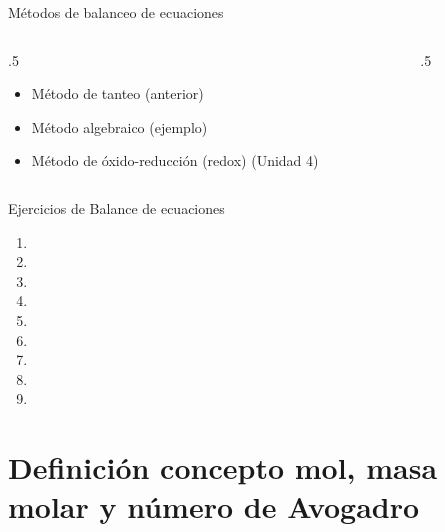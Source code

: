 \documentclass[11pt, aspectratio=169, xcolor=table]{beamer}
\begin{document}
\begin{frame}{Métodos de balanceo de ecuaciones}
	\begin{columns}
		\begin{column}{.5\textwidth}
			\begin{itemize}[<+->]
				\item Método de tanteo (anterior)
				\item Método algebraico (ejemplo)
				\item Método de óxido-reducción (redox) (Unidad 4)
			\end{itemize}
		\end{column}
		\begin{column}{.5\textwidth}
		\end{column}
	\end{columns}
\end{frame}

\begin{frame}{Ejercicios de Balance de ecuaciones}
	\begin{enumerate}
		\item {}
		\item {}
		\item {}
		\item {}
		\item {}
		\item {}
		\item {}
		\item {}
		\item {}
	\end{enumerate}

\end{frame}

\section{Definición concepto mol, masa molar y número de Avogadro}
\end{document}
